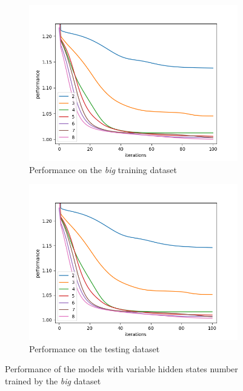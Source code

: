 \documentclass[thesis=M,english]{FITthesis}[2012/10/20]
\begin{document}
\begin{figure}
\centering
\begin{subfigure}{.8\textwidth}
  \centering
  \includegraphics[width=1\linewidth]{img/ex5/train_big.png}
  \caption{Performance on the \textit{big} training dataset}
  \label{fig:bgtrain}
\end{subfigure}
\begin{subfigure}{.8\textwidth}
  \centering
  \includegraphics[width=1\linewidth]{img/ex5/test_big.png}
  \caption{Performance on the testing dataset}
  \label{fig:bgtest}
\end{subfigure}
\caption{Performance of the models with variable hidden states number trained by the \textit{big} dataset}
\label{fig:bg}
\end{figure}
\end{document}
